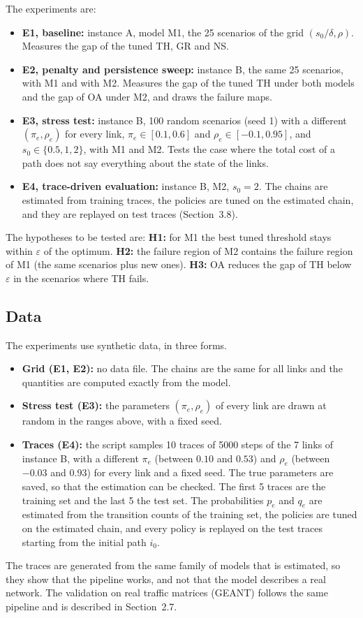The experiments are:
\begin{itemize}
  \item \textbf{E1, baseline:} instance A, model M1, the 25 scenarios of the grid $(s_0/\delta, \rho)$. Measures the gap of the tuned TH, GR and NS.
  \item \textbf{E2, penalty and persistence sweep:} instance B, the same 25 scenarios, with M1 and with M2. Measures the gap of the tuned TH under both models and the gap of OA under M2, and draws the failure maps.
  \item \textbf{E3, stress test:} instance B, 100 random scenarios (seed 1) with a different $(\pi_e, \rho_e)$ for every link, $\pi_e \in [0.1, 0.6]$ and $\rho_e \in [-0.1, 0.95]$, and $s_0 \in \{0.5, 1, 2\}$, with M1 and M2. Tests the case where the total cost of a path does not say everything about the state of the links.
  \item \textbf{E4, trace-driven evaluation:} instance B, M2, $s_0 = 2$. The chains are estimated from training traces, the policies are tuned on the estimated chain, and they are replayed on test traces (Section~3.8).
\end{itemize}

The hypotheses to be tested are:
\textbf{H1:} for M1 the best tuned threshold stays within $\varepsilon$ of the optimum.
\textbf{H2:} the failure region of M2 contains the failure region of M1 (the same scenarios plus new ones).
\textbf{H3:} OA reduces the gap of TH below $\varepsilon$ in the scenarios where TH fails.

\subsection{Data}

The experiments use synthetic data, in three forms.
\begin{itemize}
  \item \textbf{Grid (E1, E2):} no data file. The chains are the same for all links and the quantities are computed exactly from the model.
  \item \textbf{Stress test (E3):} the parameters $(\pi_e, \rho_e)$ of every link are drawn at random in the ranges above, with a fixed seed.
  \item \textbf{Traces (E4):} the script samples 10 traces of 5000 steps of the 7 links of instance B, with a different $\pi_e$ (between $0.10$ and $0.53$) and $\rho_e$ (between $-0.03$ and $0.93$) for every link and a fixed seed. The true parameters are saved, so that the estimation can be checked. The first 5 traces are the training set and the last 5 the test set. The probabilities $p_e$ and $q_e$ are estimated from the transition counts of the training set, the policies are tuned on the estimated chain, and every policy is replayed on the test traces starting from the initial path $i_0$.
\end{itemize}
The traces are generated from the same family of models that is estimated, so they show that the pipeline works, and not that the model describes a real network. The validation on real traffic matrices (GEANT) follows the same pipeline and is described in Section~2.7.

